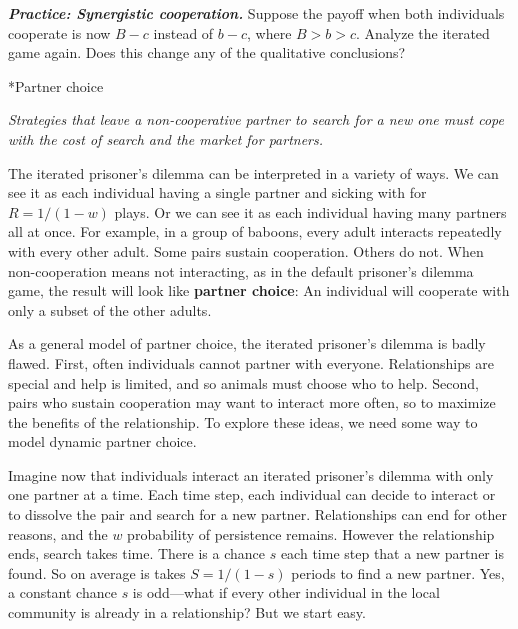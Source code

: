 \documentclass[10pt,reqno]{amsbook}
\makeatletter
\newcommand{\bemph}[1]{{\textbf{\textcolor{bemphcol}{#1}}}}
\renewcommand\section{\@startsection{section}{1}
\z@{.7\linespacing\@plus\linespacing}{.5\linespacing}
{\large\bfseries\itshape}}
\numberwithin{equation}{chapter}
\newenvironment{mathboxmp}[1]
{\begin{tcolorbox}[breakable, enhanced, oversize]\footnotesize\noindent\textbf{\emph{#1}}}
{\end{tcolorbox}}
\newenvironment{precis}
{\noi\itshape}
{\vspace{6pt}}
\newcommand{\noi}{\noindent}
\makeatother
\begin{document}
\begin{mathboxmp}{Practice: Synergistic cooperation.}
Suppose the payoff when both individuals cooperate is now $B-c$ instead of $b-c$, where $B>b>c$. Analyze the iterated game again. Does this change any of the qualitative conclusions?
\end{mathboxmp}

\section*{Partner choice}

\begin{precis}Strategies that leave a non-cooperative partner to search for a new one must cope with the cost of search and the market for partners.\end{precis}

The iterated prisoner's dilemma can be interpreted in a variety of ways. We can see it as each individual having a single partner and sicking with for $R=1/(1-w)$ plays. Or we can see it as each individual having many partners all at once. For example, in a group of baboons, every adult interacts repeatedly with every other adult. Some pairs sustain cooperation. Others do not. When non-cooperation means not interacting, as in the default prisoner's dilemma game, the result will look like \bemph{partner choice}: An individual will cooperate with only a subset of the other adults.

As a general model of {partner choice}, the iterated prisoner's dilemma is badly flawed. First, often individuals cannot partner with everyone. Relationships are special and help is limited, and so animals must choose who to help. Second, pairs who sustain cooperation may want to interact more often, so to maximize the benefits of the relationship. To explore these ideas, we need some way to model dynamic partner choice.

Imagine now that individuals interact an iterated prisoner's dilemma with only one partner at a time. Each time step, each individual can decide to interact or to dissolve the pair and search for a new partner. Relationships can end for other reasons, and the $w$ probability of persistence remains. However the relationship ends, search takes time. There is a chance $s$ each time step that a new partner is found. So on average is takes $S=1/(1-s)$ periods to find a new partner. Yes, a constant chance $s$ is odd---what if every other individual in the local community is already in a relationship? But we start easy.
\end{document}
